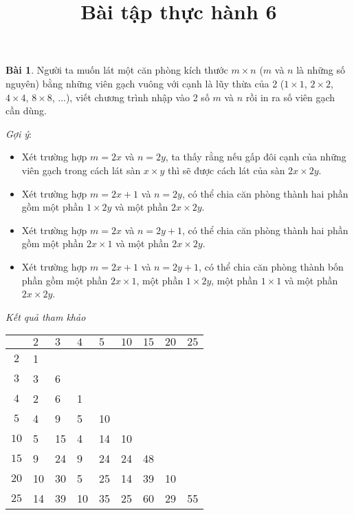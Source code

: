 \documentclass[12pt, a4paper]{article}
\title{Bài tập thực hành 6}
\date{}
\author{}
\begin{document}
    \onehalfspacing
    \maketitle
    \textbf{Bài 1}. Người ta muốn lát một căn phòng kích thước $m \times n$ ($m$ và $n$ là những số nguyên) 
    bằng những viên gạch vuông với cạnh là lũy thừa của 2 ($1 \times 1$, $2 \times 2$, $4 \times 4$, $8 \times 8$, ...),
	viết chương trình nhập vào 2 số $m$ và $n$ rồi in ra số viên gạch cần dùng.

	\textit{Gợi ý}:
	\begin{itemize}
		\item Xét trường hợp $m = 2x$ và $n = 2y$, ta thấy rằng nếu gấp đôi cạnh của những viên gạch 
		trong cách lát sàn $x \times y$ thì sẽ được cách lát của sàn $2x \times 2y$.
		\item Xét trường hợp $m = 2x+1$ và $n = 2y$, có thể chia căn phòng thành hai phần gồm 
        một phần $1 \times 2y$ và một phần $2x \times 2y$.
        \item Xét trường hợp $m = 2x$ và $n = 2y+1$, có thể chia căn phòng thành hai phần gồm 
        một phần $2x \times 1$ và một phần $2x \times 2y$.
        \item Xét trường hợp $m = 2x+1$ và $n = 2y+1$, có thể chia căn phòng thành bốn phần gồm 
        một phần $2x \times 1$, một phần $1 \times 2y$, một phần $1 \times 1$ và một phần $2x \times 2y$.
	\end{itemize}

    \textit{Kết quả tham khảo}
    \begin{table}[h]
        \centering
        \begin{tabular}{|c|M|M|M|M|M|M|M|M|}
            \hline
             &$2$ &$3$ &$4$ &$5$ &$10$ &$15$ &$20$ &$25$          \\ \hline
            $2$ &1 & & & & & & &     \\ \hline
            $3$ &3 &6 & & & & & &       \\ \hline
            $4$ &2 &6 &1 & & & & &       \\ \hline
            $5$ &4 &9 &5 &10 & & & &       \\ \hline
            $10$ &5 &15 &4 &14 &10 & & &      \\ \hline
            $15$ &9 &24 &9 &24 &24 &48 & &      \\ \hline
            $20$ &10 &30 &5 &25 &14 &39 &10 &      \\ \hline
            $25$ &14 &39 &10 &35 &25 &60 &29 &55      \\ \hline
        \end{tabular}
    \end{table}
\end{document}
